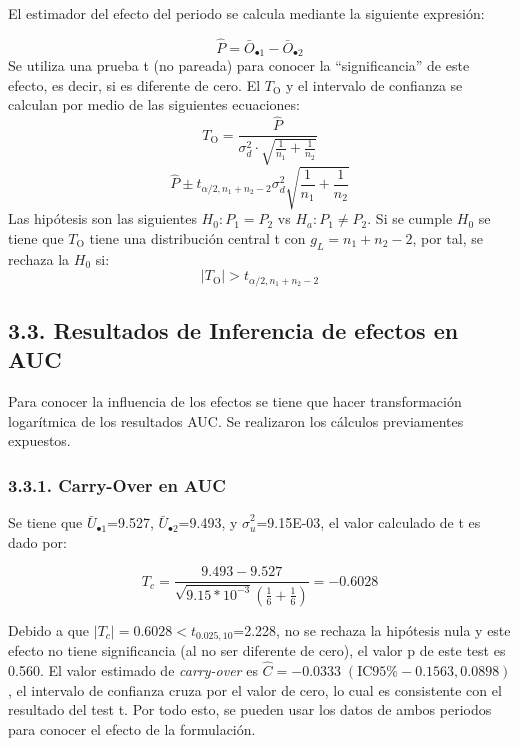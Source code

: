\documentclass[]{article}
\begin{document}
El estimador del efecto del periodo se calcula mediante la siguiente
expresión:

\[\hat{P} = \bar{O}_{\bullet1}-\bar{O}_{\bullet2}\] Se utiliza una
prueba t (no pareada) para conocer la ``significancia'' de este efecto,
es decir, si es diferente de cero. El \(T_{\textrm{O}}\) y el intervalo
de confianza se calculan por medio de las siguientes ecuaciones:\\
\[T_{\textrm{O}} = \frac{\hat{P}}{\sigma_{d}^{2}\cdot\sqrt{\frac{1}{n_{1}}+\frac{1}{n_{2}}}}\]
\[\hat{P} \pm t_{\alpha/2, n_{1}+n_{2}-2} \sigma_{d}^{2} \sqrt{\frac{1}{n_{1}}+\frac{1}{n_{2}}}\]
Las hipótesis son las siguientes \(H_{0}: P_{1} = P_{2}\) vs
\(H_{a}: P_{1} \neq P_{2}\). Si se cumple \(H_{0}\) se tiene que
\(T_{\textrm{O}}\) tiene una distribución central t con
\(g_{L} = n_{1}+n_{2}-2\), por tal, se rechaza la \(H_{0}\) si:\\
\[\left |T_{\textrm{O}} \right | > t_{\alpha/2,n_{1}+n_{2}-2}\]

\subsection{3.3. Resultados de Inferencia de efectos en
AUC}\label{resultados-de-inferencia-de-efectos-en-auc}

Para conocer la influencia de los efectos se tiene que hacer
transformación logarítmica de los resultados AUC. Se realizaron los
cálculos previamentes expuestos.

\subsubsection{3.3.1. Carry-Over en AUC}\label{carry-over-en-auc}

Se tiene que \(\bar{U}_{\bullet1}\)=9.527, \(\bar{U}_{\bullet2}\)=9.493,
y \(\hat{\sigma}_{u}^{2}\)=9.15E-03, el valor calculado de t es dado
por:

\[T_{c}=\frac{9.493-9.527}{\sqrt{9.15*10^{-3}}\left(\frac{1}{6}+\frac{1}{6}\right)}=-0.6028\]

Debido a que \(\left|T_{c}\right|=0.6028<t_{0.025,10}\)=2.228, no se
rechaza la hipótesis nula y este efecto no tiene significancia (al no
ser diferente de cero), el valor p de este test es 0.560. El valor
estimado de \emph{carry-over} es
\(\hat{C}=-0.0333\;(\textrm{IC95}\%-0.1563,0.0898)\), el intervalo de
confianza cruza por el valor de cero, lo cual es consistente con el
resultado del test t. Por todo esto, se pueden usar los datos de ambos
periodos para conocer el efecto de la formulación.
\end{document}
